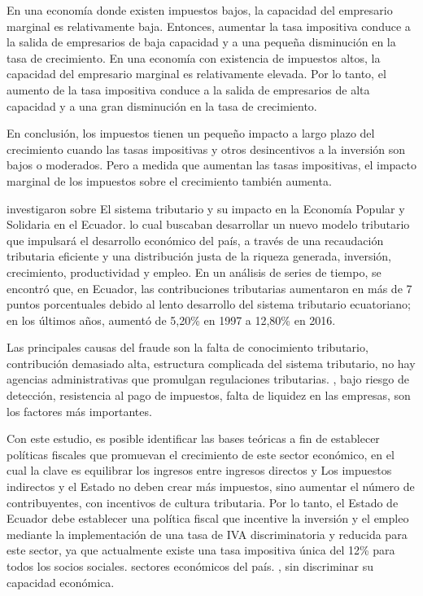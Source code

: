 \documentclass[
  letterpaper,
  DIV=11,
  numbers=noendperiod]{scrartcl}
\begin{document}
En una economía donde existen impuestos bajos, la capacidad del
empresario marginal es relativamente baja. Entonces, aumentar la tasa
impositiva conduce a la salida de empresarios de baja capacidad y a una
pequeña disminución en la tasa de crecimiento. En una economía con
existencia de impuestos altos, la capacidad del empresario marginal es
relativamente elevada. Por lo tanto, el aumento de la tasa impositiva
conduce a la salida de empresarios de alta capacidad y a una gran
disminución en la tasa de crecimiento.

En conclusión, los impuestos tienen un pequeño impacto a largo plazo del
crecimiento cuando las tasas impositivas y otros desincentivos a la
inversión son bajos o moderados. Pero a medida que aumentan las tasas
impositivas, el impacto marginal de los impuestos sobre el crecimiento
también aumenta.

\textcite{campos_sistema_2018} investigaron sobre El sistema tributario
y su impacto en la Economía Popular y Solidaria en el Ecuador. lo cual
buscaban desarrollar un nuevo modelo tributario que impulsará el
desarrollo económico del país, a través de una recaudación tributaria
eficiente y una distribución justa de la riqueza generada, inversión,
crecimiento, productividad y empleo. En un análisis de series de tiempo,
se encontró que, en Ecuador, las contribuciones tributarias aumentaron
en más de 7 puntos porcentuales debido al lento desarrollo del sistema
tributario ecuatoriano; en los últimos años, aumentó de 5,20\% en 1997 a
12,80\% en 2016.

Las principales causas del fraude son la falta de conocimiento
tributario, contribución demasiado alta, estructura complicada del
sistema tributario, no hay agencias administrativas que promulgan
regulaciones tributarias. , bajo riesgo de detección, resistencia al
pago de impuestos, falta de liquidez en las empresas, son los factores
más importantes.

Con este estudio, es posible identificar las bases teóricas a fin de
establecer políticas fiscales que promuevan el crecimiento de este
sector económico, en el cual la clave es equilibrar los ingresos entre
ingresos directos y Los impuestos indirectos y el Estado no deben crear
más impuestos, sino aumentar el número de contribuyentes, con incentivos
de cultura tributaria. Por lo tanto, el Estado de Ecuador debe
establecer una política fiscal que incentive la inversión y el empleo
mediante la implementación de una tasa de IVA discriminatoria y reducida
para este sector, ya que actualmente existe una tasa impositiva única
del 12\% para todos los socios sociales. sectores económicos del país. ,
sin discriminar su capacidad económica.
\end{document}
